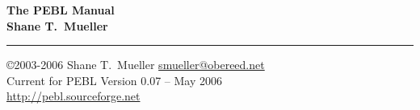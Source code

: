 \documentclass[letter,11pt]{report}
\begin{document}
\begin{center}
\LARGE
\textbf{The PEBL Manual} \\
\vspace{0.7cm}\Large \textbf{Shane T.~Mueller}
\end{center}
\rule{\textwidth}{1mm}


\vspace{.4cm}

\normalsize
\noindent\copyright 2003-2006 Shane T.~Mueller \href{mailto:smueller@obereed.net}{smueller@obereed.net}\\
Current for PEBL Version 0.07 -- May 2006 \\
\href{http://pebl.sourceforge.net}{http://pebl.sourceforge.net}
\tableofcontents

\clearpage
{}











\appendix
\end{document}
